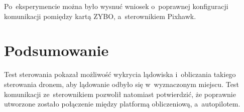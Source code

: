 Po~eksperymencie można było wysnuć wniosek o~poprawnej konfiguracji komunikacji pomiędzy kartą ZYBO, a~sterownikiem Pixhawk.

\section{Podsumowanie}
Test sterowania pokazał możliwość wykrycia lądowiska i~obliczania takiego sterowania dronem, aby lądowanie odbyło się w~wyznaczonym miejscu. Test komunikacji ze~sterownikiem pozwolił natomiast potwierdzić, że poprawnie utworzone zostało połączenie między platformą obliczeniową, a~autopilotem. 
